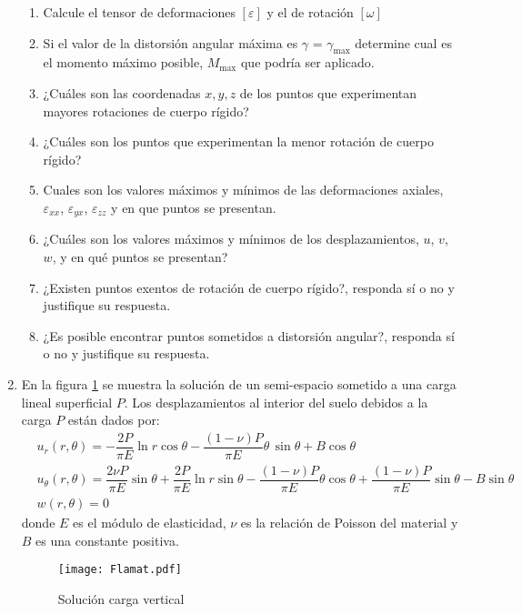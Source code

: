 \documentclass[../notas medios.tex]{subfiles}
\begin{document}
\begin{enumerate}
\begin{enumerate}
\item Calcule el tensor de deformaciones  $[\varepsilon]$ y el de rotación 
$[\omega]$ 

\item Si el valor de la distorsión angular máxima es $\gamma$ = $\gamma_{\max}$ 
determine cual es el momento máximo posible, $M_{\max}$ que podría ser 
aplicado. 

\item¿Cuáles son las coordenadas $x,y,z$ de los puntos que experimentan 
mayores rotaciones de cuerpo rígido?

\item ¿Cuáles son los puntos que experimentan la menor rotación de cuerpo 
rígido? 

\item Cuales son los valores máximos y mínimos de las deformaciones axiales, 
$\varepsilon_{xx}$, $\varepsilon_{yx}$, $\varepsilon_{zz}$ y en que puntos se 
presentan.

\item ¿Cuáles son los valores máximos y mínimos de los desplazamientos, $u$, 
$v$, $w$, y en qué puntos se presentan?

\item ¿Existen puntos exentos de rotación de cuerpo rígido?, responda sí 
o no y justifique su respuesta.

\item ¿Es posible encontrar puntos sometidos a distorsión angular?, responda 
sí o no y justifique su respuesta.

\end{enumerate}

\item \label{punto07_d}  En la figura \cref{Solucion_Flamant} se  muestra la 
solución de un semi-espacio sometido a una carga lineal superficial $P$.  Los 
desplazamientos al interior del suelo debidos a la carga $P$ están dados por:
\begin{align*}
&u_r (r,\theta) = -\dfrac{2P}{\pi E} \ln{r} \cos \theta -\dfrac{(1 - 
\nu)P}{\pi E} \theta\, \sin\theta + B \cos \theta \\
&u_{\theta}(r,\theta) = \dfrac{2 \nu P}{\pi E} \sin\theta + 
\dfrac{2P}{\pi E}\ln{r}\sin\theta - \dfrac{(1 - \nu)P} {\pi E} 
\theta \cos\theta + \dfrac{(1 - \nu)P}{\pi E} \sin\theta - B \sin\theta\\
& w (r,\theta) = 0
\end{align*}
donde $E$ es el módulo de elasticidad,  $\nu$ es la relación de 
Poisson del material y $B$ es una constante positiva.
\begin{figure}[H]
	\centering
		\texttt{[image: Flamat.pdf]} 
		\caption{Soluci\'on carga vertical}
		\label{Solucion_Flamant}
\end{figure}


\end{enumerate}
\end{document}
